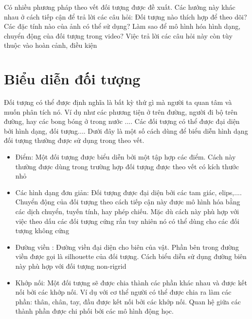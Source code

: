 \documentclass[12pt,oneside,a4]{report}
\begin{document}
Có nhiều phương pháp theo vết đối tượng được đề xuất. Các hướng này khác nhau ở cách tiếp cận để trả lời các câu hỏi: Đối tượng nào thích hợp để theo dõi? Các đặc tính nào của ảnh có thể sử dụng? Làm sao để mô hình hóa hình dạng, chuyển động của đối tượng trong video? Việc trả lời các câu hỏi này còn tùy thuộc vào hoàn cảnh, điều kiện 
\section{Biểu diễn đối tượng }
Đối tượng có thể được định nghĩa là bất kỳ thứ gì mà người ta quan tâm và muốn phân tích nó. Ví dụ như các phương tiện ở trên đường, người đi bộ trên đường, hay các bong bóng ở trong nước .... Các đối tượng có thể được đại diện bởi hình dạng, đối tượng.... Dưới đây là một số cách dùng để biểu diễn hình dạng đối tượng thường được sử dụng trong  theo vết. 
\begin{itemize}
\item Điểm: Một đối tượng được biểu diễn bởi một tập hợp các điểm. Cách này thường được dùng trong trường hợp đối tượng được theo vết có kích thước nhỏ
\item Các hình dạng đơn giản: Đối tượng được đại diện bởi các tam giác, elips,.... Chuyển động của đối tượng theo cách tiếp cận này được mô hình hóa bằng các dịch chuyển, tuyến tính, hay phép chiếu. Mặc dù cách này phù hợp với việc theo dấu các đối tượng cứng rắn tuy nhiên nó có thể dùng cho các đối tượng không cứng
\item Đường viền : Đường viền đại diện cho biên của vật. Phần bên trong đường viền được gọi là silhouette của đối tượng. Cách biểu diễn sử dụng đường biên này phù hợp với đối tượng non-rigrid
\item Khớp nối: Một đối tượng sẽ được chia thành các phần khác nhau và được kết nối bởi các khớp nối. Ví dụ với cơ thể người có thể được chia ra làm các phần: thân, chân, tay,  đầu được kết nối bởi các khớp nối. Quan hệ giữa các thành phần được chi phối bởi các mô hình động học.
\end{itemize}
\end{document}
